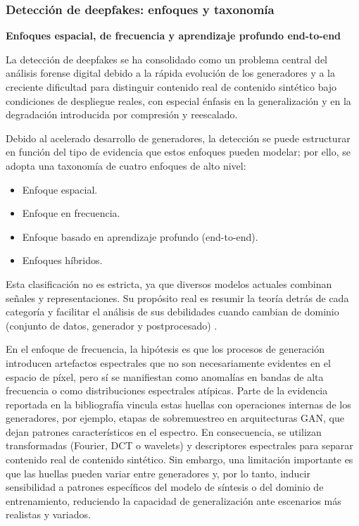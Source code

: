 \subsubsection{Detección de deepfakes: enfoques y taxonomía}

\medskip\textbf{Enfoques espacial, de frecuencia y aprendizaje profundo end-to-end}


La detección de deepfakes se ha consolidado como un problema central del análisis forense digital debido a la rápida evolución de los generadores y a la creciente dificultad para distinguir contenido real de contenido sintético bajo condiciones de despliegue reales, con especial énfasis en la generalización y en la degradación introducida por compresión y reescalado.

Debido al acelerado desarrollo de generadores, la detección se puede estructurar en función del tipo de evidencia que estos enfoques pueden modelar; por ello, se adopta una taxonomía de cuatro enfoques de alto nivel:
\begin{itemize}
    \item Enfoque espacial.
    \item Enfoque en frecuencia.
    \item Enfoque basado en aprendizaje profundo (end-to-end).
    \item Enfoques híbridos. 
\end{itemize}
Esta clasificación no es estricta, ya que diversos modelos actuales combinan señales y representaciones. Su propósito real es resumir la teoría detrás de cada categoría y facilitar el análisis de sus debilidades cuando cambian de dominio (conjunto de datos, generador y postprocesado) \parencite{MurguiaSerrano2025, Banerjee2025}.

En el enfoque de frecuencia, la hipótesis es que los procesos de generación introducen artefactos espectrales que no son necesariamente evidentes en el espacio de píxel, pero sí se manifiestan como anomalías en bandas de alta frecuencia o como distribuciones espectrales atípicas. Parte de la evidencia reportada en la bibliografía vincula estas huellas con operaciones internas de los generadores, por ejemplo, etapas de sobremuestreo en arquitecturas GAN, que dejan patrones característicos en el espectro. En consecuencia, se utilizan transformadas (Fourier, DCT o wavelets) y descriptores espectrales para separar contenido real de contenido sintético. Sin embargo, una limitación importante es que las huellas pueden variar entre generadores y, por lo tanto, inducir sensibilidad a patrones específicos del modelo de síntesis o del dominio de entrenamiento, reduciendo la capacidad de generalización ante escenarios más realistas y variados. \parencite{Tan2024}


